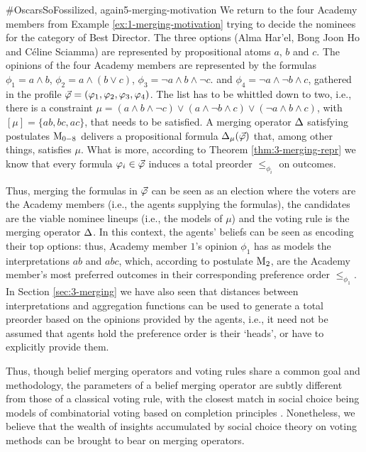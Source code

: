 \begin{xmpl}{$\#$OscarsSoFossilized, again}{5-merging-motivation}
	We return to the four Academy members from Example \ref{ex:1-merging-motivation} 
	trying to decide the nominees for the category of Best Director.
	The three options (Alma Har'el, Bong Joon Ho and C\'eline Sciamma) 
	are represented by propositional atoms $a$, $b$ and $c$.
	The opinions of the four Academy members are represented by the formulas
	$\phi_1 = a\land b$,
	$\phi_2 = a\land (b\lor c)$,
	$\phi_3 = \lnot a\land b \land \lnot c$.
	and
	$\phi_4 = \lnot a \land\lnot b\land c$,
	gathered in the profile $\P=(\phi_1,\phi_2,\phi_3,\phi_4)$.
	The list has to be whittled down to two,
	i.e., there is a constraint 
	$\mu=(a\land b\land \lnot c)\lor (a\land\lnot b\land c)\lor(\lnot a\land b\land c)$,
	with $[\mu]=\{ab,bc,ac\}$,
	that needs to be satisfied.
	A merging operator $\me$ satisfying postulates $\ppm{0-8}$ 
	delivers a propositional formula $\me_\mu(\P)$ that, 
	among other things, satisfies $\mu$.
	What is more, according to Theorem \ref{thm:3-merging-repr}
	we know that every formula $\phi_{i}\in \P$ 
	induces a total preorder $\le_{\phi_i}$ on outcomes.

	Thus, merging the formulas in $\P$ can be seen as an election
	where the voters are the Academy members (i.e., the agents supplying the formulas),
	the candidates are the viable nominee lineups (i.e., the models of $\mu$)
	and the voting rule is the merging operator $\me$.
	In this context, the agents' beliefs can be seen as
	encoding their top options:
	thus, Academy member $1$'s opinion $\phi_1$ has as models the interpretations 
	$ab$ and $abc$, which, according to postulate $\ppm{2}$, 
	are the Academy member's most preferred outcomes in their 
	corresponding preference order $\le_{\phi_1}$.
	In Section \ref{sec:3-merging} we have also seen that 
	distances between interpretations and aggregation functions 
	can be used to generate a total preorder based on the opinions 
	provided by the agents, i.e., it need not be assumed that agents 
	hold the preference order is their `heads', or have to explicitly 
	provide them.
\end{xmpl}

Thus, though belief merging operators and voting rules 
share a common goal and methodology, 
the parameters of a belief merging operator are subtly 
different from those of a classical voting rule,
with the closest match in social choice being 
models of combinatorial voting based on completion principles 
\cite{LangX16}.
Nonetheless, we believe that the wealth of insights 
accumulated by social choice theory 
on voting methods can be brought to bear on merging operators.

